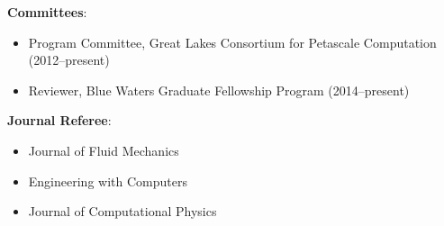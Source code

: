

\textbf{Committees}:
\begin{itemize}
\itemsep 0pt
\item Program Committee, Great Lakes Consortium for Petascale Computation (2012--present)
\item Reviewer, Blue Waters Graduate Fellowship Program (2014--present)
\end{itemize}

\blankline


\textbf{Journal Referee}:
\begin{itemize}
\itemsep 0pt
         \item Journal of Fluid Mechanics
         \item Engineering with Computers
         \item Journal of Computational Physics
\end{itemize}
